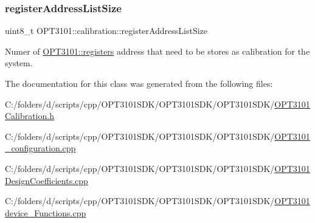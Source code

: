 \mbox{\label{class_o_p_t3101_1_1calibration_af17ddf5a6cc9919a1bfebde92e0d314f}} 
\subsubsection{\texorpdfstring{register\+Address\+List\+Size}{registerAddressListSize}}
{\footnotesize\ttfamily uint8\+\_\+t O\+P\+T3101\+::calibration\+::register\+Address\+List\+Size}



Numer of \mbox{\hyperlink{class_o_p_t3101_1_1registers}{O\+P\+T3101\+::registers}} address that need to be stores as calibration for the system. 



The documentation for this class was generated from the following files\+:\begin{DoxyCompactItemize}
\item 
C\+:/folders/d/scripts/cpp/\+O\+P\+T3101\+S\+D\+K/\+O\+P\+T3101\+S\+D\+K/\+O\+P\+T3101\+S\+D\+K/\mbox{\hyperlink{_o_p_t3101_calibration_8h}{O\+P\+T3101\+Calibration.\+h}}\item 
C\+:/folders/d/scripts/cpp/\+O\+P\+T3101\+S\+D\+K/\+O\+P\+T3101\+S\+D\+K/\+O\+P\+T3101\+S\+D\+K/\mbox{\hyperlink{_o_p_t3101__configuration_8cpp}{O\+P\+T3101\+\_\+configuration.\+cpp}}\item 
C\+:/folders/d/scripts/cpp/\+O\+P\+T3101\+S\+D\+K/\+O\+P\+T3101\+S\+D\+K/\+O\+P\+T3101\+S\+D\+K/\mbox{\hyperlink{_o_p_t3101_design_coefficients_8cpp}{O\+P\+T3101\+Design\+Coefficients.\+cpp}}\item 
C\+:/folders/d/scripts/cpp/\+O\+P\+T3101\+S\+D\+K/\+O\+P\+T3101\+S\+D\+K/\+O\+P\+T3101\+S\+D\+K/\mbox{\hyperlink{_o_p_t3101device___functions_8cpp}{O\+P\+T3101device\+\_\+\+Functions.\+cpp}}\end{DoxyCompactItemize}
